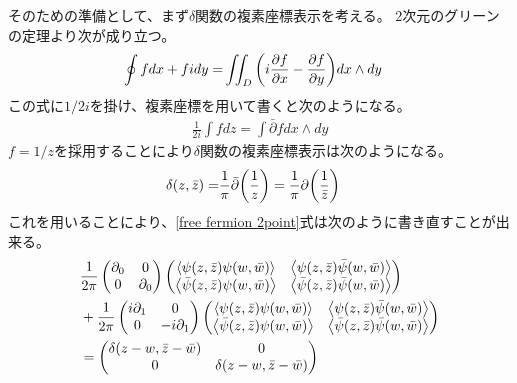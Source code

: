 \documentclass[11pt, dvipdfmx]{article}
\numberwithin{equation}{section}
\begin{document}
そのための準備として、まず$\delta$関数の複素座標表示を考える。
2次元のグリーンの定理より次が成り立つ。
\begin{align}
    \oint f dx +fi dy=& \iint_D \qty(i\pdv{f}{x} -\pdv{f}{y}) dx\wedge dy
\end{align}   
この式に$1/2i$を掛け、複素座標を用いて書くと次のようになる。
\begin{align}
\frac{1}{2i}\int f dz=\int \bar{\partial} f dx\wedge dy
\end{align}
$f=1/z$を採用することにより$\delta$関数の複素座標表示は次のようになる。
\begin{align}
    \delta (z,\bar{z})=& \frac{1}{\pi }\bar{\partial} \qty(\frac{1}{z})=\frac{1}{\pi}\partial\qty(\frac{1}{\bar{z}})\label{deltacom}
\end{align}
これを用いることにより、\eqref{free fermion 2point}式は次のように書き直すことが出来る。
\begin{align}
    &\frac{1}{2\pi}\begin{pmatrix}
        \partial_0 & 0 \\
        0& \partial_0
    \end{pmatrix}\begin{pmatrix}
        \ev{\psi(z,\bar{z})\psi(w,\bar{w})} & \ev{\psi(z,\bar{z})\bar{\psi}(w,\bar{w})} \\
        \ev{\bar{\psi}(z,\bar{z})\psi(w,\bar{w})} & \ev{\bar{\psi}(z,\bar{z})\bar{\psi}(w,\bar{w})}
    \end{pmatrix}\nonumber\\
    &+\frac{1}{2\pi}\begin{pmatrix}
         i\partial_1&0 \\
        0 & -i\partial_1
    \end{pmatrix}\begin{pmatrix}
        \ev{\psi(z,\bar{z})\psi(w,\bar{w})} & \ev{\psi(z,\bar{z})\bar{\psi}(w,\bar{w})} \\
        \ev{\bar{\psi}(z,\bar{z})\psi(w,\bar{w})} & \ev{\bar{\psi}(z,\bar{z})\bar{\psi}(w,\bar{w})}
    \end{pmatrix}\nonumber
    \\&= \begin{pmatrix}
        \delta(z-w,\bar{z}-\bar{w}) & 0 \\
        0 & \delta(z-w,\bar{z}-\bar{w})\end{pmatrix}
\end{align}
\end{document}
